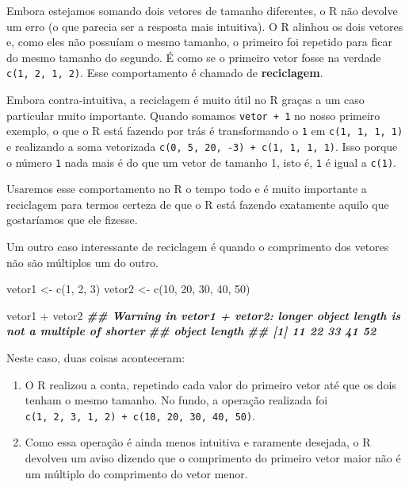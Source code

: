 \documentclass[
]{book}
\newenvironment{Shaded}{\begin{snugshade}}{\end{snugshade}}
\newcommand{\DecValTok}[1]{\textcolor[rgb]{0.00,0.00,0.81}{#1}}
\newcommand{\DocumentationTok}[1]{\textcolor[rgb]{0.56,0.35,0.01}{\textbf{\textit{#1}}}}
\newcommand{\FunctionTok}[1]{\textcolor[rgb]{0.00,0.00,0.00}{#1}}
\newcommand{\NormalTok}[1]{#1}
\newcommand{\OtherTok}[1]{\textcolor[rgb]{0.56,0.35,0.01}{#1}}
\newcommand{\SpecialCharTok}[1]{\textcolor[rgb]{0.00,0.00,0.00}{#1}}
\begin{document}
Embora estejamos somando dois vetores de tamanho diferentes, o R não devolve um erro (o que parecia ser a resposta mais intuitiva). O R alinhou os dois vetores e, como eles não possuíam o mesmo tamanho, o primeiro foi repetido para ficar do mesmo tamanho do segundo. É como se o primeiro vetor fosse na verdade \texttt{c(1,\ 2,\ 1,\ 2)}. Esse comportamento é chamado de \textbf{reciclagem}.

Embora contra-intuitiva, a reciclagem é muito útil no R graças a um caso particular muito importante. Quando somamos \texttt{vetor\ +\ 1} no nosso primeiro exemplo, o que o R está fazendo por trás é transformando o \texttt{1} em \texttt{c(1,\ 1,\ 1,\ 1)} e realizando a soma vetorizada \texttt{c(0,\ 5,\ 20,\ -3)\ +\ c(1,\ 1,\ 1,\ 1)}. Isso porque o número \texttt{1} nada mais é do que um vetor de tamanho 1, isto é, \texttt{1} é igual a \texttt{c(1)}.

Usaremos esse comportamento no R o tempo todo e é muito importante a reciclagem para termos certeza de que o R está fazendo exatamente aquilo que gostaríamos que ele fizesse.

Um outro caso interessante de reciclagem é quando o comprimento dos vetores não são múltiplos um do outro.

\begin{Shaded}
\begin{Highlighting}[]
\NormalTok{vetor1 }\OtherTok{\textless{}{-}} \FunctionTok{c}\NormalTok{(}\DecValTok{1}\NormalTok{, }\DecValTok{2}\NormalTok{, }\DecValTok{3}\NormalTok{)}
\NormalTok{vetor2 }\OtherTok{\textless{}{-}} \FunctionTok{c}\NormalTok{(}\DecValTok{10}\NormalTok{, }\DecValTok{20}\NormalTok{, }\DecValTok{30}\NormalTok{, }\DecValTok{40}\NormalTok{, }\DecValTok{50}\NormalTok{)}

\NormalTok{vetor1 }\SpecialCharTok{+}\NormalTok{ vetor2}
\DocumentationTok{\#\# Warning in vetor1 + vetor2: longer object length is not a multiple of shorter}
\DocumentationTok{\#\# object length}
\DocumentationTok{\#\# [1] 11 22 33 41 52}
\end{Highlighting}
\end{Shaded}

Neste caso, duas coisas aconteceram:

\begin{enumerate}
\def\labelenumi{\arabic{enumi}.}
\item
  O R realizou a conta, repetindo cada valor do primeiro vetor até que os dois tenham o mesmo tamanho. No fundo, a operação realizada foi \texttt{c(1,\ 2,\ 3,\ 1,\ 2)\ +\ c(10,\ 20,\ 30,\ 40,\ 50)}.
\item
  Como essa operação é ainda menos intuitiva e raramente desejada, o R devolveu um aviso dizendo que o comprimento do primeiro vetor maior não é um múltiplo do comprimento do vetor menor.
\end{enumerate}
\end{document}
